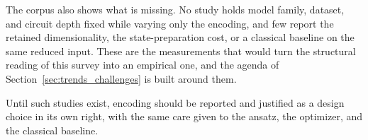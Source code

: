 \documentclass{ieeeaccess}
\begin{document}
The corpus also shows what is missing. No study holds model family, dataset, and circuit depth fixed while varying only the encoding, and few report the retained dimensionality, the state-preparation cost, or a classical baseline on the same reduced input. These are the measurements that would turn the structural reading of this survey into an empirical one, and the agenda of Section~\ref{sec:trends_challenges} is built around them.

Until such studies exist, encoding should be reported and justified as a design choice in its own right, with the same care given to the ansatz, the optimizer, and the classical baseline.




\EOD
\end{document}
